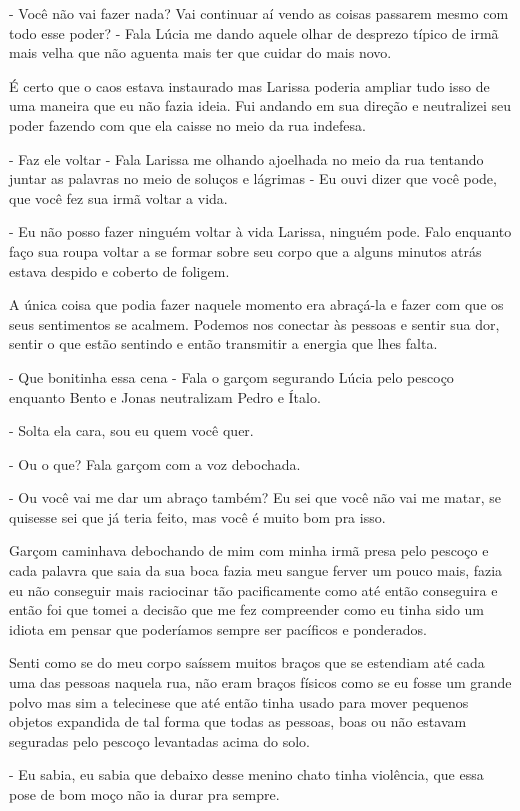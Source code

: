 - Você não vai fazer nada? Vai continuar aí vendo as coisas passarem mesmo com todo esse poder? - Fala Lúcia me dando aquele olhar de desprezo típico de irmã mais velha que não aguenta mais ter que cuidar do mais novo.

É certo que o caos estava instaurado mas Larissa poderia ampliar tudo isso de uma maneira que eu não fazia ideia. Fui andando em sua direção e neutralizei seu poder fazendo com que ela caisse no meio da rua indefesa.

- Faz ele voltar - Fala Larissa me olhando ajoelhada no meio da rua tentando juntar as palavras no meio de soluços e lágrimas - Eu ouvi dizer que você pode, que você fez sua irmã voltar a vida.

- Eu não posso fazer ninguém voltar à vida Larissa, ninguém pode. Falo enquanto faço sua roupa voltar a se formar sobre seu corpo que a alguns minutos atrás estava despido e coberto  de foligem.

A única coisa que podia fazer naquele momento era abraçá-la e fazer com que os seus sentimentos se acalmem. Podemos nos conectar às pessoas e sentir sua dor, sentir o que estão sentindo e então transmitir a energia que lhes falta.

- Que bonitinha essa cena - Fala o garçom segurando Lúcia pelo pescoço enquanto Bento e Jonas neutralizam Pedro e Ítalo.

- Solta ela cara, sou eu quem você quer.

- Ou o que? Fala garçom com a voz debochada.

- Ou você vai me dar um abraço também? Eu sei que você não vai me matar, se quisesse sei que já teria feito, mas você é muito bom pra isso.

Garçom caminhava debochando de mim com minha irmã presa pelo pescoço e cada palavra que saia da sua boca fazia meu sangue ferver um pouco mais, fazia eu não conseguir mais raciocinar tão pacificamente como até então conseguira e então foi que tomei a decisão que me fez compreender como eu tinha sido um idiota em pensar que poderíamos sempre ser pacíficos e ponderados.

Senti como se do meu corpo saíssem muitos braços que se estendiam até cada uma das pessoas naquela rua, não eram braços físicos como se eu fosse um grande polvo mas sim a telecinese que até então tinha usado para mover pequenos objetos expandida de tal forma que todas as pessoas, boas ou não estavam seguradas pelo pescoço levantadas acima do solo.

- Eu sabia, eu sabia que debaixo desse menino chato tinha violência, que essa pose de bom moço não ia durar pra sempre.

